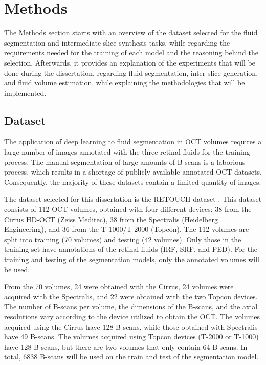 \chapter{Methods}\label{Methods}
The Methods section starts with an overview of the dataset selected for the fluid segmentation and intermediate slice synthesis tasks, while regarding the requirements needed for the training of each model and the reasoning behind the selection. Afterwards, it provides an explanation of the experiments that will be done during the dissertation, regarding fluid segmentation, inter-slice generation, and fluid volume estimation, while explaining the methodologies that will be implemented.

\section{Dataset}
The application of deep learning to fluid segmentation in OCT volumes requires a large number of images annotated with the three retinal fluids for the training process. The manual segmentation of large amounts of B-scans is a laborious process, which results in a shortage of publicly available annotated OCT datasets. Consequently, the majority of these datasets contain a limited quantity of images.
\par
The dataset selected for this dissertation is the RETOUCH dataset \parencite{Bogunovic2019b}. This dataset consists of 112 OCT volumes, obtained with four different devices: 38 from the Cirrus HD-OCT (Zeiss Meditec), 38 from the Spectralis (Heidelberg Engineering), and 36 from the \mbox{T-1000}/T-2000 (Topcon). The 112 volumes are split into training (70 volumes) and testing (42 volumes). Only those in the training set have annotations of the retinal fluids (IRF, SRF, and PED). For the training and testing of the segmentation models, only the annotated volumes will be used.
\par
From the 70 volumes, 24 were obtained with the Cirrus, 24 volumes were acquired with the Spectralis, and 22 were obtained with the two Topcon devices. The number of B-scans per volume, the dimensions of the B-scans, and the axial resolutions vary according to the device utilized to obtain the OCT. The volumes acquired using the Cirrus have 128 B-scans, while those obtained with Spectralis have 49 B-scans. The volumes acquired using Topcon devices (\mbox{T-2000} or \mbox{T-1000}) have 128 B-scans, but there are two volumes that only contain 64 \mbox{B-scans}. In total, 6838 B-scans will be used on the train and test of the segmentation model.
